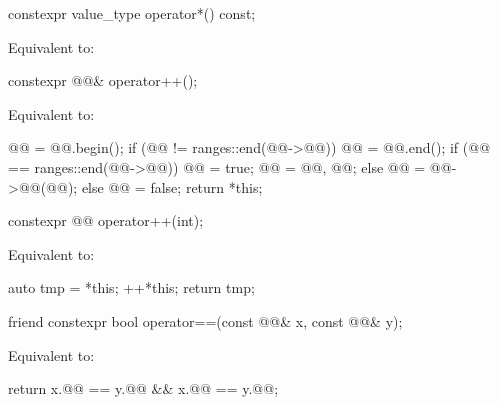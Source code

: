 \begin{itemdecl}
constexpr value_type operator*() const;
\end{itemdecl}

\begin{itemdescr}
\pnum
\effects
Equivalent to: 
\end{itemdescr}

\begin{itemdecl}
constexpr @@& operator++();
\end{itemdecl}

\begin{itemdescr}
\pnum
\effects
Equivalent to:
\begin{codeblock}
@@ = @@.begin();
if (@@ != ranges::end(@@->@@)) {
  @@ = @@.end();
  if (@@ == ranges::end(@@->@@)) {
    @@ = true;
    @@ = {@@, @@};
  } else {
    @@ = @@->@@(@@);
  }
} else {
  @@ = false;
}
return *this;
\end{codeblock}
\end{itemdescr}

\begin{itemdecl}
constexpr @@ operator++(int);
\end{itemdecl}

\begin{itemdescr}
\pnum
\effects
Equivalent to:
\begin{codeblock}
auto tmp = *this;
++*this;
return tmp;
\end{codeblock}
\end{itemdescr}

\begin{itemdecl}
friend constexpr bool operator==(const @@& x, const @@& y);
\end{itemdecl}

\begin{itemdescr}
\pnum
\effects
Equivalent to:
\begin{codeblock}
return x.@@ == y.@@ && x.@@ == y.@@;
\end{codeblock}
\end{itemdescr}

